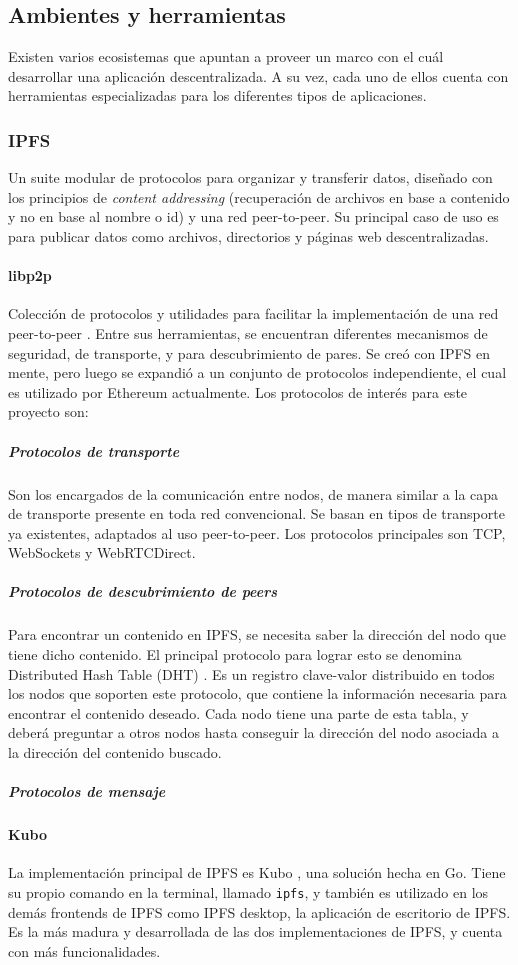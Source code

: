 \subsection{Ambientes y herramientas}
Existen varios ecosistemas que apuntan a proveer un marco con el cuál desarrollar una aplicación descentralizada. A su vez, cada uno de ellos cuenta con herramientas especializadas para los diferentes tipos de aplicaciones.

\subsubsection{IPFS}
Un suite modular de protocolos para organizar y transferir datos, diseñado con los principios de \textit{content addressing} (recuperación de archivos en base a contenido y no en base al nombre o id) y una red peer-to-peer. Su principal caso de uso es para publicar datos como archivos, directorios y páginas web descentralizadas.\cite{ipfs}

\paragraph{libp2p} Colección de protocolos y utilidades para facilitar la implementación de una red peer-to-peer \cite{libp2p}. Entre sus herramientas, se encuentran diferentes mecanismos de seguridad, de transporte, y para descubrimiento de pares. Se creó con IPFS en mente, pero luego se expandió a un conjunto de protocolos independiente, el cual es utilizado por Ethereum actualmente. Los protocolos de interés para este proyecto son:
\subparagraph{Protocolos de transporte} Son los encargados de la comunicación entre nodos, de manera similar a la capa de transporte presente en toda red convencional. Se basan en tipos de transporte ya existentes, adaptados al uso peer-to-peer. Los protocolos principales son TCP, WebSockets y WebRTCDirect.
\subparagraph{Protocolos de descubrimiento de peers} Para encontrar un contenido en IPFS, se necesita saber la dirección del nodo que tiene dicho contenido. El principal protocolo para lograr esto se denomina Distributed Hash Table (DHT) \cite{dht}. Es un registro clave-valor distribuido en todos los nodos que soporten este protocolo, que contiene la información necesaria para encontrar el contenido deseado. Cada nodo tiene una parte de esta tabla, y deberá preguntar a otros nodos hasta conseguir la dirección del nodo asociada a la dirección del contenido buscado.
\subparagraph{Protocolos de mensaje}

\paragraph{Kubo} La implementación principal de IPFS es Kubo \cite{kubo}, una solución hecha en Go. Tiene su propio comando en la terminal, llamado \texttt{ipfs}, y también es utilizado en los demás frontends de IPFS como IPFS desktop, la aplicación de escritorio de IPFS. Es la más madura y desarrollada de las dos implementaciones de IPFS, y cuenta con más funcionalidades.

